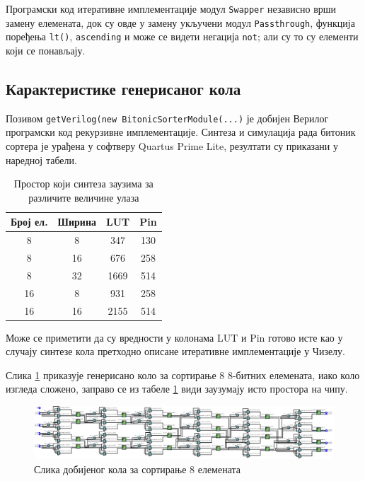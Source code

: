 \documentclass[12pt, a4paper]{article}
\theoremstyle{definition}
\begin{document}
Програмски код итеративне имплементације модул \verb+Swapper+ независно врши замену елемената, док су овде у замену укључени модул \verb+Passthrough+, функција поређења \verb+lt()+, \verb+ascending+ и може се видети негација \verb+not+; али су то су елементи који се понављају.

\subsection{Карактеристике генерисаног кола}
Позивом \verb+getVerilog(new BitonicSorterModule(...)+ је добијен Верилог програмски код рекурзивне имплементације. Синтеза и симулација рада битоник сортера је урађена у софтверу Quartus Prime Lite, резултати су приказани у наредној табели.
\begin{table}[H]
\centering
 \begin{tabular}{| c | c | c c |}
  \hline
  Број ел. & Ширина & LUT & Pin \\
  \hline
  8 & 8  & 347 & 130 \\
  8 & 16 & 676 & 258 \\
  8 & 32 & 1669 & 514 \\
  \hline
  16 & 8 & 931 & 258 \\
  16 & 16 & 2155 & 514 \\
  \hline
 \end{tabular}
 \caption{Простор који синтеза заузима за различите величине улаза}
 \label{tab:cipSintezaRec}
\end{table}
Може се приметити да су вредности у колонама LUT и Pin готово исте као у случају синтезе кола претходно описане итеративне имплементације у Чизелу.

Слика \ref{fig:RTL_Rec} приказује генерисано коло за сортирање 8 8-битних елемената, иако коло изгледа сложено, заправо се из табеле \ref{tab:cipSintezaRec} види заузумају исто простора на чипу.

\begin{figure}[H]
  \centering
      \includegraphics[scale=0.24]{slike/RTL_Rec_8_8.png}
  \caption{Слика добијеног кола за сортирање 8 елемената}
  \label{fig:RTL_Rec}
\end{figure}
\end{document}
